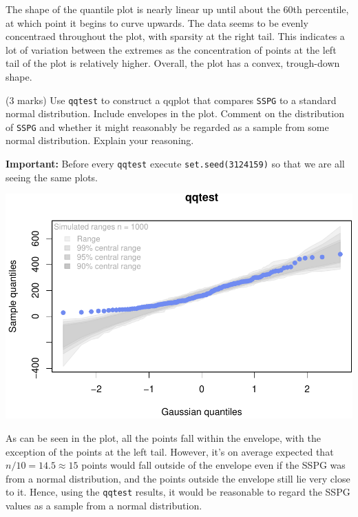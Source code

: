 \documentclass[9pt,letter]{article}
\newenvironment{Shaded}{\begin{snugshade}}{\end{snugshade}}
\newcommand{\KeywordTok}[1]{\textcolor[rgb]{0.13,0.29,0.53}{\textbf{#1}}}
\newcommand{\DataTypeTok}[1]{\textcolor[rgb]{0.13,0.29,0.53}{#1}}
\newcommand{\DecValTok}[1]{\textcolor[rgb]{0.00,0.00,0.81}{#1}}
\newcommand{\CommentTok}[1]{\textcolor[rgb]{0.56,0.35,0.01}{\textit{#1}}}
\newcommand{\OperatorTok}[1]{\textcolor[rgb]{0.81,0.36,0.00}{\textbf{#1}}}
\newcommand{\NormalTok}[1]{#1}
\begin{document}
The shape of the quantile plot is nearly linear up until about the 60th
percentile, at which point it begins to curve upwards. The data seems to
be evenly concentraed throughout the plot, with sparsity at the right
tail. This indicates a lot of variation between the extremes as the
concentration of points at the left tail of the plot is relatively
higher. Overall, the plot has a convex, trough-down shape.

\item 

(3 marks) Use \texttt{qqtest} to construct a qqplot that compares
\texttt{SSPG} to a standard normal distribution. Include envelopes in
the plot. Comment on the distribution of \texttt{SSPG} and whether it
might reasonably be regarded as a sample from some normal distribution.
Explain your reasoning.

\textbf{Important:} Before every \texttt{qqtest} execute
\texttt{set.seed(3124159)} so that we are all seeing the same plots.

\begin{Shaded}
\end{Shaded}

\includegraphics{a4_solutions_files/figure-latex/unnamed-chunk-4-1.pdf}

As can be seen in the plot, all the points fall within the envelope,
with the exception of the points at the left tail. However, it's on
average expected that \(n/10 = 14.5 \approx 15\) points would fall
outside of the envelope even if the SSPG was from a normal distribution,
and the points outside the envelope still lie very close to it. Hence,
using the \texttt{qqtest} results, it would be reasonable to regard the
SSPG values as a sample from a normal distribution.
\end{document}
